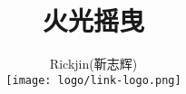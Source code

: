 %
\hypersetup{CJKbookmarks=true}
\title{\Huge \youyuan \textbf{火光摇曳}}
\author{\youyuan Rickjin(靳志辉) \\
\texttt{[image: logo/link-logo.png]}
}

\maketitle
\tableofcontents


